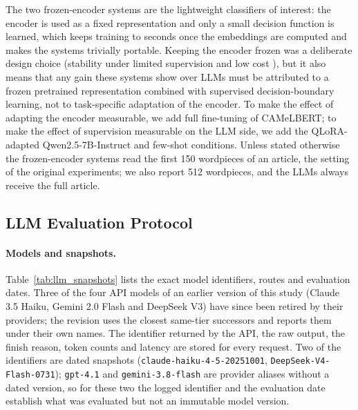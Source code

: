\documentclass[preprint,12pt,authoryear]{elsarticle}
\newif\ifrevmarkup
\DeclareRobustCommand{\rev}[1]{\ifrevmarkup{\color{blue}#1}\else#1\fi}
\begin{document}
\rev{The two frozen-encoder systems are the lightweight classifiers of interest: the encoder is used as a fixed representation and only a small decision function is learned, which keeps training to seconds once the embeddings are computed and makes the systems trivially portable. Keeping the encoder frozen was a deliberate design choice (stability under limited supervision and low cost \cite{AlAyyoub2017, antoun2020, elnagar2023benchmark}), but it also means that any gain these systems show over LLMs must be attributed to a frozen pretrained representation combined with supervised decision-boundary learning, not to task-specific adaptation of the encoder. To make the effect of adapting the encoder measurable, we add full fine-tuning of CAMeLBERT; to make the effect of supervision measurable on the LLM side, we add the QLoRA-adapted Qwen2.5-7B-Instruct and few-shot conditions. Unless stated otherwise the frozen-encoder systems read the first 150 wordpieces of an article, the setting of the original experiments; we also report 512 wordpieces, and the LLMs always receive the full article.}

\subsection{\rev{LLM Evaluation Protocol}}
\label{prompting}

\paragraph{\rev{Models and snapshots.}} \rev{Table~\ref{tab:llm_snapshots} lists the exact model identifiers, routes and evaluation dates. Three of the four API models of an earlier version of this study (Claude 3.5 Haiku, Gemini 2.0 Flash and DeepSeek V3) have since been retired by their providers; the revision uses the closest same-tier successors and reports them under their own names. The identifier returned by the API, the raw output, the finish reason, token counts and latency are stored for every request. Two of the identifiers are dated snapshots (\texttt{claude-haiku-4-5-20251001}, \texttt{DeepSeek-V4-Flash-0731}); \texttt{gpt-4.1} and \texttt{gemini-3.8-flash} are provider aliases without a dated version, so for these two the logged identifier and the evaluation date establish what was evaluated but not an immutable model version.}
\end{document}
